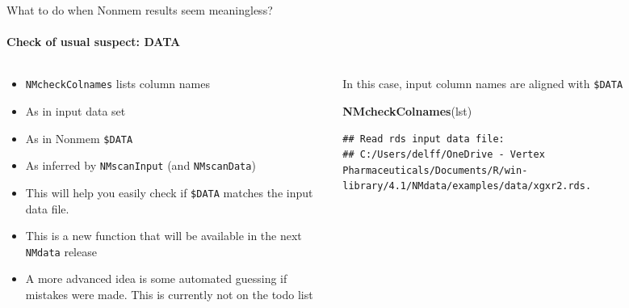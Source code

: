 \documentclass[
  8pt,
  ignorenonframetext,
  aspectratio=169]{beamer}
\newenvironment{Shaded}{\begin{snugshade}}{\end{snugshade}}
\newcommand{\KeywordTok}[1]{\textcolor[rgb]{0.13,0.29,0.53}{\textbf{#1}}}
\newcommand{\NormalTok}[1]{#1}
\providecommand{\tightlist}{%
  \setlength{\itemsep}{0pt}\setlength{\parskip}{0pt}}
\begin{document}
\begin{frame}[fragile]{What to do when Nonmem results seem meaningless?}
\protect\hypertarget{what-to-do-when-nonmem-results-seem-meaningless}{}
\framesubtitle{Check of usual suspect: DATA}

\begin{columns}[T]
\begin{column}{0.48\textwidth}
\begin{itemize}
\tightlist
\item
  \texttt{NMcheckColnames} lists column names
\item
  As in input data set
\item
  As in Nonmem \texttt{\$DATA}
\item
  As inferred by \texttt{NMscanInput} (and \texttt{NMscanData})
\item
  This will help you easily check if \texttt{\$DATA} matches the input
  data file.
\item
  This is a new function that will be available in the next
  \texttt{NMdata} release
\item
  A more advanced idea is some automated guessing if mistakes were made.
  This is currently not on the todo list
\end{itemize}
\end{column}

\begin{column}{0.48\textwidth}
In this case, input column names are aligned with \texttt{\$DATA}
\footnotesize

\begin{Shaded}
\begin{Highlighting}[]
\KeywordTok{NMcheckColnames}\NormalTok{(lst)}
\end{Highlighting}
\end{Shaded}

\begin{verbatim}
## Read rds input data file:
## C:/Users/delff/OneDrive - Vertex Pharmaceuticals/Documents/R/win-library/4.1/NMdata/examples/data/xgxr2.rds.
\end{verbatim}


\end{column}
\end{columns}
\end{frame}
\end{document}
